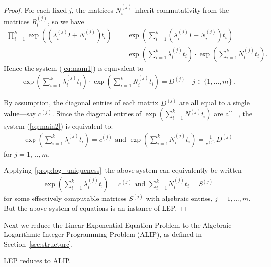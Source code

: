 \documentclass[format=acmsmall, review=false, screen=true]{acmart}
\begin{document}
\begin{proof}
For each fixed $j$, the matrices $N_{i}^{(j)}$ inherit commutativity from
the matrices $B^{(j)}_{i}$, so we have
\begin{align*}
\prod\limits_{i=1}^{k} \exp \left( (\lambda_i^{(j)}I + N_i^{(j)})t_{i} \right) &=
   \exp \left(\sum_{i=1}^{k} (\lambda_i^{(j)}I  +
 N_i^{(j)}) t_i \right)\\
&= \exp\left(\sum_{i=1}^{k} \lambda_i^{(j)} t_i\right) \cdot
   \exp\left(\sum_{i=1}^{k} N_i^{(j)} t_i \right) .
\end{align*}
Hence the system (\ref{eq:main1}) is equivalent to
\begin{align}
\exp\left(\sum_{i=1}^{k} \lambda_i^{(j)} t_i\right) \cdot
   \exp\left(\sum_{i=1}^{k} N_i^{(j)} t_i \right)  = D^{(j)}
\quad j \in \lbrace 1, \ldots, m\rbrace \, .
\label{eq:main2}
\end{align}

By assumption, the diagonal entries of each matrix $D^{(j)}$ are
all equal to a single value---say $c^{(j)}$.
Since the diagonal entries of
$\exp\left(\sum_{i=1}^{k} N^{(j)}t_i\right)$
are all $1$, the system (\ref{eq:main2}) is equivalent to:
\begin{align*}
\exp\left(\sum_{i=1}^{k} \lambda_i^{(j)} t_i\right)
= c^{(j)} \mbox{ and }\exp\left(\sum_{i=1}^{k} N_i^{(j)} t_i \right)
=\frac{1}{c^{(j)}} D^{(j)}
\end{align*}
for $j=1,\ldots,m$.

Applying~\cref{prop:log_uniqueness}, the
above system can equivalently be written
\begin{align}
\exp\left(\sum_{i=1}^{k} \lambda_i^{(j)} t_i\right)
= c^{(j)} \mbox{ and } \sum_{i=1}^{k}
N_i^{(j)} t_i =
S^{(j)}
\label{eq:almost-final}
\end{align}
for  some effectively computable matrices
$S^{(j)}$ with algebraic entries, $j=1,\ldots,m$.
But the above system of equations is an
instance of LEP\@.
\end{proof}

Next we reduce the Linear-Exponential Equation Problem to the
Algebraic-Logarithmic Integer Programming Problem (ALIP), as defined
in Section~\ref{sec:structure}.

\begin{proposition}
\label{reference-for-log}
LEP reduces to ALIP\@.
\end{proposition}
\end{document}
